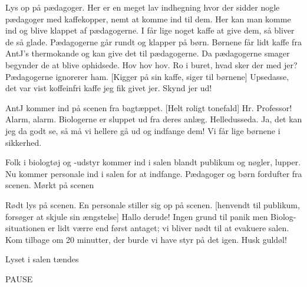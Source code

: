 \documentclass[a4paper,12pt]{article}
\begin{document}
\begin{sketch}
\scene Lys op på pædagoger. Her er en meget lav indhegning hvor der sidder nogle pædagoger med kaffekopper, nemt at komme ind til dem.
Her kan man komme ind og blive klappet af pædagogerne. I får lige noget kaffe at give dem, så bliver de så glade.
\scene Pædagogerne går rundt og klapper på børn. Børnene får lidt kaffe fra AntJ's thermokande og kan give det til pædagogerne. Da pædagogerne smager begynder de at blive ophidsede.
Hov hov hov. Ro i buret, hvad sker der med jer?
\scene Pædagogerne ignorerer ham.
[Kigger på sin kaffe, siger til børnene] Upsedasse, det var vist koffeinfri kaffe jeg fik givet jer. Skynd jer ud!

\scene AntJ kommer ind på scenen fra bagtæppet.
[Helt roligt tonefald] Hr. Professor! Alarm, alarm. Biologerne er sluppet ud fra deres anlæg.
Helledusseda. Ja, det kan jeg da godt se, så må vi hellere gå ud og indfange dem! Vi får lige børnene i sikkerhed.

\scene Folk i biologtøj og -udstyr kommer ind i salen blandt publikum og nøgler, lupper. Nu kommer personale ind i salen for at indfange. Pædagoger og børn fordufter fra scenen.
\scene Mørkt på scenen

\scene Rødt lys på scenen. En personale stiller sig op på scenen.
[henvendt til publikum, forsøger at skjule sin ængstelse] Hallo derude! Ingen grund til panik  men Biolog-situationen er lidt værre end først antaget; vi bliver nødt til at evakuere salen. Kom tilbage om 20 minutter, der burde vi have styr på det igen. Husk guldøl!

\scene Lyset i salen tændes

PAUSE


\end{sketch}
\end{document}
